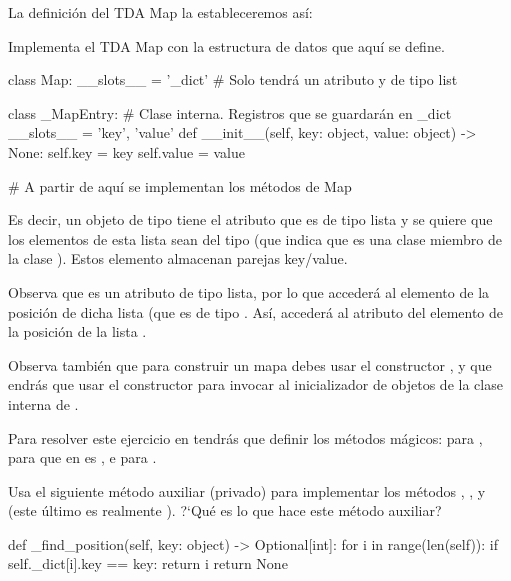 La definición del TDA Map la estableceremos así:





Implementa el TDA Map con la estructura de datos que aquí se define. 

\begin{pyverbatim}[][frame=single]
class Map:
    __slots__ = '_dict'  # Solo tendrá un atributo y de tipo list

    class _MapEntry:     # Clase interna. Registros que se guardarán en _dict
        __slots__ = 'key', 'value'
        def __init__(self, key: object, value: object) -> None:
            self.key = key
            self.value = value

# A partir de aquí se implementan los métodos de Map
\end{pyverbatim}


Es decir, un objeto de tipo  tiene el atributo  que es de tipo lista y  se quiere que los elementos de esta lista sean del tipo  (que indica que  es una clase miembro de la clase ). Estos elemento almacenan parejas key/value. 

Observa que  es un atributo de tipo lista, por lo que  accederá al elemento de la posición  de dicha lista (que es de tipo . Así,   accederá al atributo  del elemento de la posición  de la lista .  

Observa también que para construir un mapa debes usar el constructor , y que endrás que usar el constructor  para invocar al inicializador de objetos de la clase  interna  de .



Para resolver este ejercicio en  tendrás que definir los métodos mágicos:
 para ,  para  que en  es , e  para .


Usa el siguiente método auxiliar (privado) para implementar los métodos , ,  y  (este último es realmente ). ?`Qué es lo que hace este método auxiliar?
\begin{pyverbatim}[][frame=single]
    def _find_position(self, key: object) -> Optional[int]:
        for i in range(len(self)):
            if self._dict[i].key == key:
                return i
        return None
\end{pyverbatim}







